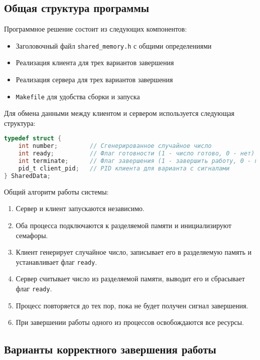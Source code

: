 \documentclass[a4paper,12pt]{article}
\begin{document}
\subsection{Общая структура программы}
Программное решение состоит из следующих компонентов:
\begin{itemize}
    \item Заголовочный файл \texttt{shared\_memory.h} с общими определениями
    \item Реализация клиента для трех вариантов завершения
    \item Реализация сервера для трех вариантов завершения
    \item \texttt{Makefile} для удобства сборки и запуска
\end{itemize}
Для обмена данными между клиентом и сервером используется следующая структура:
\begin{lstlisting}[language=C, caption=Структура данных для обмена]
typedef struct {
    int number;         // Сгенерированное случайное число
    int ready;          // Флаг готовности (1 - число готово, 0 - нет)
    int terminate;      // Флаг завершения (1 - завершить работу, 0 - продолжать)
    pid_t client_pid;   // PID клиента для варианта с сигналами
} SharedData;
\end{lstlisting}
Общий алгоритм работы системы:
\begin{enumerate}
    \item Сервер и клиент запускаются независимо.
    \item Оба процесса подключаются к разделяемой памяти и инициализируют семафоры.
    \item Клиент генерирует случайное число, записывает его в разделяемую память и устанавливает флаг \texttt{ready}.
    \item Сервер считывает число из разделяемой памяти, выводит его и сбрасывает флаг \texttt{ready}.
    \item Процесс повторяется до тех пор, пока не будет получен сигнал завершения.
    \item При завершении работы одного из процессов освобождаются все ресурсы.
\end{enumerate}
\subsection{Варианты корректного завершения работы}
\end{document}
